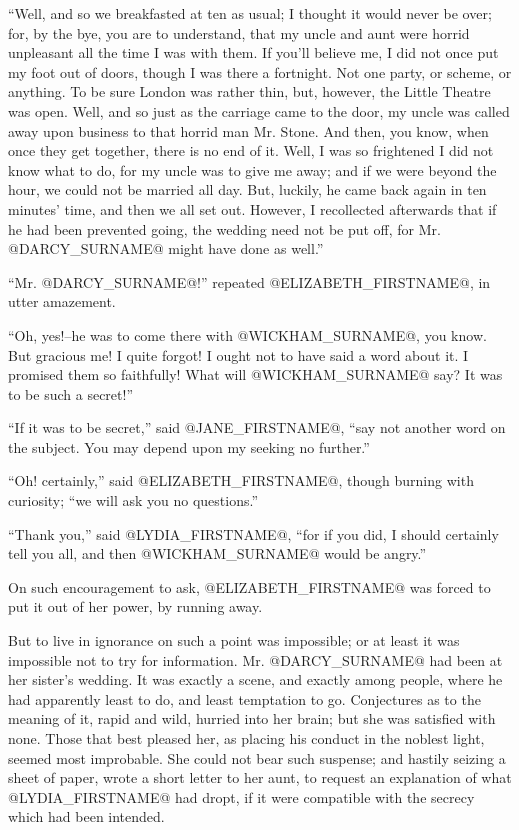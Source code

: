 ``Well, and so we breakfasted at ten as usual; I thought it would never
be over; for, by the bye, you are to understand, that my uncle and aunt
were horrid unpleasant all the time I was with them. If you'll believe
me, I did not once put my foot out of doors, though I was there a
fortnight. Not one party, or scheme, or anything. To be sure London was
rather thin, but, however, the Little Theatre was open. Well, and so
just as the carriage came to the door, my uncle was called away upon
business to that horrid man Mr. Stone. And then, you know, when once
they get together, there is no end of it. Well, I was so frightened I
did not know what to do, for my uncle was to give me away; and if we
were beyond the hour, we could not be married all day. But, luckily, he
came back again in ten minutes' time, and then we all set out. However,
I recollected afterwards that if he had been prevented going, the
wedding need not be put off, for Mr. @DARCY_SURNAME@ might have done as well.''

``Mr. @DARCY_SURNAME@!'' repeated @ELIZABETH_FIRSTNAME@, in utter amazement.

``Oh, yes!--he was to come there with @WICKHAM_SURNAME@, you know. But gracious
me! I quite forgot! I ought not to have said a word about it. I promised
them so faithfully! What will @WICKHAM_SURNAME@ say? It was to be such a secret!''

``If it was to be secret,'' said @JANE_FIRSTNAME@, ``say not another word on the
subject. You may depend upon my seeking no further.''

``Oh! certainly,'' said @ELIZABETH_FIRSTNAME@, though burning with curiosity; ``we will
ask you no questions.''

``Thank you,'' said @LYDIA_FIRSTNAME@, ``for if you did, I should certainly tell you
all, and then @WICKHAM_SURNAME@ would be angry.''

On such encouragement to ask, @ELIZABETH_FIRSTNAME@ was forced to put it out of her
power, by running away.

But to live in ignorance on such a point was impossible; or at least
it was impossible not to try for information. Mr. @DARCY_SURNAME@ had been at
her sister's wedding. It was exactly a scene, and exactly among people,
where he had apparently least to do, and least temptation to go.
Conjectures as to the meaning of it, rapid and wild, hurried into her
brain; but she was satisfied with none. Those that best pleased her, as
placing his conduct in the noblest light, seemed most improbable. She
could not bear such suspense; and hastily seizing a sheet of paper,
wrote a short letter to her aunt, to request an explanation of what
@LYDIA_FIRSTNAME@ had dropt, if it were compatible with the secrecy which had been
intended.


